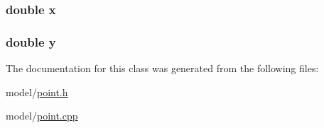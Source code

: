 \subsubsection[{\texorpdfstring{x}{x}}]{\setlength{\rightskip}{0pt plus 5cm}double x\hspace{0.3cm}{\ttfamily [private]}}\hypertarget{classMODEL_1_1Point_af88b946fb90d5f08b5fb740c70e98c10}{}\label{classMODEL_1_1Point_af88b946fb90d5f08b5fb740c70e98c10}
\subsubsection[{\texorpdfstring{y}{y}}]{\setlength{\rightskip}{0pt plus 5cm}double y\hspace{0.3cm}{\ttfamily [private]}}\hypertarget{classMODEL_1_1Point_ab927965981178aa1fba979a37168db2a}{}\label{classMODEL_1_1Point_ab927965981178aa1fba979a37168db2a}


The documentation for this class was generated from the following files\+:\begin{DoxyCompactItemize}
\item 
model/\hyperlink{point_8h}{point.\+h}\item 
model/\hyperlink{point_8cpp}{point.\+cpp}\end{DoxyCompactItemize}
